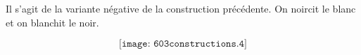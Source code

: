 \begin{cursive}
Il s'agit de la variante \og{}négative\fg{} de la construction précédente.  On noircit le blanc et on blanchit le noir.
\end{cursive}
\[\texttt{[image: 603constructions.4]}\]
